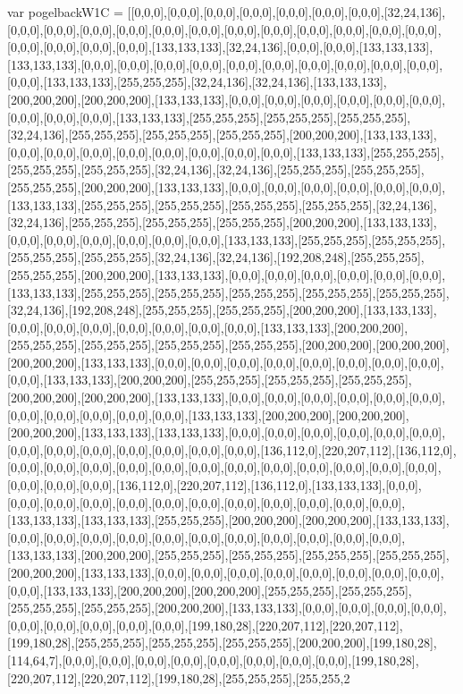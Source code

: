 var pogelbackW1C = [[0,0,0],[0,0,0],[0,0,0],[0,0,0],[0,0,0],[0,0,0],[0,0,0],[32,24,136],[0,0,0],[0,0,0],[0,0,0],[0,0,0],[0,0,0],[0,0,0],[0,0,0],[0,0,0],[0,0,0],[0,0,0],[0,0,0],[0,0,0],[0,0,0],[0,0,0],[0,0,0],[0,0,0],[133,133,133],[32,24,136],[0,0,0],[0,0,0],[133,133,133],[133,133,133],[0,0,0],[0,0,0],[0,0,0],[0,0,0],[0,0,0],[0,0,0],[0,0,0],[0,0,0],[0,0,0],[0,0,0],[0,0,0],[133,133,133],[255,255,255],[32,24,136],[32,24,136],[133,133,133],[200,200,200],[200,200,200],[133,133,133],[0,0,0],[0,0,0],[0,0,0],[0,0,0],[0,0,0],[0,0,0],[0,0,0],[0,0,0],[0,0,0],[133,133,133],[255,255,255],[255,255,255],[255,255,255],[32,24,136],[255,255,255],[255,255,255],[255,255,255],[200,200,200],[133,133,133],[0,0,0],[0,0,0],[0,0,0],[0,0,0],[0,0,0],[0,0,0],[0,0,0],[0,0,0],[133,133,133],[255,255,255],[255,255,255],[255,255,255],[32,24,136],[32,24,136],[255,255,255],[255,255,255],[255,255,255],[200,200,200],[133,133,133],[0,0,0],[0,0,0],[0,0,0],[0,0,0],[0,0,0],[0,0,0],[133,133,133],[255,255,255],[255,255,255],[255,255,255],[255,255,255],[32,24,136],[32,24,136],[255,255,255],[255,255,255],[255,255,255],[200,200,200],[133,133,133],[0,0,0],[0,0,0],[0,0,0],[0,0,0],[0,0,0],[0,0,0],[133,133,133],[255,255,255],[255,255,255],[255,255,255],[255,255,255],[32,24,136],[32,24,136],[192,208,248],[255,255,255],[255,255,255],[200,200,200],[133,133,133],[0,0,0],[0,0,0],[0,0,0],[0,0,0],[0,0,0],[0,0,0],[133,133,133],[255,255,255],[255,255,255],[255,255,255],[255,255,255],[255,255,255],[32,24,136],[192,208,248],[255,255,255],[255,255,255],[200,200,200],[133,133,133],[0,0,0],[0,0,0],[0,0,0],[0,0,0],[0,0,0],[0,0,0],[0,0,0],[133,133,133],[200,200,200],[255,255,255],[255,255,255],[255,255,255],[255,255,255],[200,200,200],[200,200,200],[200,200,200],[133,133,133],[0,0,0],[0,0,0],[0,0,0],[0,0,0],[0,0,0],[0,0,0],[0,0,0],[0,0,0],[0,0,0],[133,133,133],[200,200,200],[255,255,255],[255,255,255],[255,255,255],[200,200,200],[200,200,200],[133,133,133],[0,0,0],[0,0,0],[0,0,0],[0,0,0],[0,0,0],[0,0,0],[0,0,0],[0,0,0],[0,0,0],[0,0,0],[0,0,0],[133,133,133],[200,200,200],[200,200,200],[200,200,200],[133,133,133],[133,133,133],[0,0,0],[0,0,0],[0,0,0],[0,0,0],[0,0,0],[0,0,0],[0,0,0],[0,0,0],[0,0,0],[0,0,0],[0,0,0],[0,0,0],[0,0,0],[136,112,0],[220,207,112],[136,112,0],[0,0,0],[0,0,0],[0,0,0],[0,0,0],[0,0,0],[0,0,0],[0,0,0],[0,0,0],[0,0,0],[0,0,0],[0,0,0],[0,0,0],[0,0,0],[0,0,0],[0,0,0],[136,112,0],[220,207,112],[136,112,0],[133,133,133],[0,0,0],[0,0,0],[0,0,0],[0,0,0],[0,0,0],[0,0,0],[0,0,0],[0,0,0],[0,0,0],[0,0,0],[0,0,0],[0,0,0],[133,133,133],[133,133,133],[255,255,255],[200,200,200],[200,200,200],[133,133,133],[0,0,0],[0,0,0],[0,0,0],[0,0,0],[0,0,0],[0,0,0],[0,0,0],[0,0,0],[0,0,0],[0,0,0],[0,0,0],[133,133,133],[200,200,200],[255,255,255],[255,255,255],[255,255,255],[255,255,255],[200,200,200],[133,133,133],[0,0,0],[0,0,0],[0,0,0],[0,0,0],[0,0,0],[0,0,0],[0,0,0],[0,0,0],[0,0,0],[133,133,133],[200,200,200],[200,200,200],[255,255,255],[255,255,255],[255,255,255],[255,255,255],[200,200,200],[133,133,133],[0,0,0],[0,0,0],[0,0,0],[0,0,0],[0,0,0],[0,0,0],[0,0,0],[0,0,0],[0,0,0],[199,180,28],[220,207,112],[220,207,112],[199,180,28],[255,255,255],[255,255,255],[255,255,255],[200,200,200],[199,180,28],[114,64,7],[0,0,0],[0,0,0],[0,0,0],[0,0,0],[0,0,0],[0,0,0],[0,0,0],[0,0,0],[199,180,28],[220,207,112],[220,207,112],[199,180,28],[255,255,255],[255,255,2